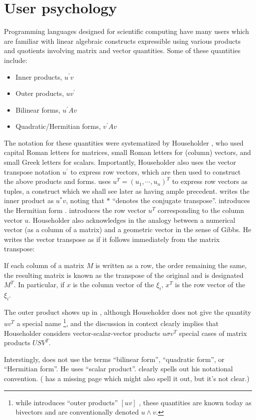 \section{User psychology}

Programming languages designed for scientific computing have many users which are familiar with linear algebraic constructs expressible using various products and quotients involving matrix and vector quantities. Some of these quantities include:

\begin{itemize}
  \item Inner products, $u^\prime v$
  \item Outer products, $u v^\prime$
  \item Bilinear forms, $u^\prime A v$
  \item Quadratic/Hermitian forms, $v^\prime A v$
\end{itemize}

The notation for these quantities were systematized by Householder \cite{Householder1953,Householder1955}, who used capital Roman letters for matrices, small Roman letters for (column) vectors, and small Greek letters for scalars. Importantly, Householder also uses the vector transpose notation $u^\prime$ to express row vectors, which are then used to construct the above products and forms. \cite{Householder1955} uses $u^T = (u_1, \cdots, u_n)^T$ to express row vectors as tuples, a construct which we shall see later as having ample precedent. \cite{Householder1955} writes the inner product as $u^* v$, noting that $*$ ``denotes the conjugate transpose''. \cite[Sec. 4.01]{Householder1953} introduces the Hermitian form . \cite[Sec. 2.04]{Householder1953} introduces the row vector $u^T$ corresponding to the column vector $u$. Householder also acknowledges in \cite[Sec. 2.04]{Householder1953} the analogy between a numerical vector (as a column of a matrix) and a geometric vector in the sense of Gibbs. He writes the vector transpose as if it follows immediately from the matrix transpose: 

If each column of a matrix $M$ is written as a row, the order remaining the same, the resulting matrix is known as the transpose of the original and is designated $M^T$. In particular, if $x$ is the column vector of the $\xi_i$, $x^T$ is the row vector of the $\xi_i$.

The outer product shows up in \cite[Sec. 2.24]{Householder1953}, although Householder does not give the quantity $u v^T$ a special name \footnote{while \cite[Sec. 2.03]{Householder1953} introduces ``outer products'' $[u v]$ , these quantities are known today as bivectors and are conventionally denoted $u \wedge v$.}, and the discussion in context clearly implies that Householder considers vector-scalar-vector products $u \sigma v^T$ special cases of matrix products $U S V^T$.

Interstingly, \cite{Householder1953} does not use the terms ``bilinear form'', ``quadratic form'', or ``Hermitian form''. He uses ``scalar product''. \cite{Householder1955} clearly spells out his notational convention. (\cite{Householder1953} has a missing page which might also spell it out, but it's not clear.)